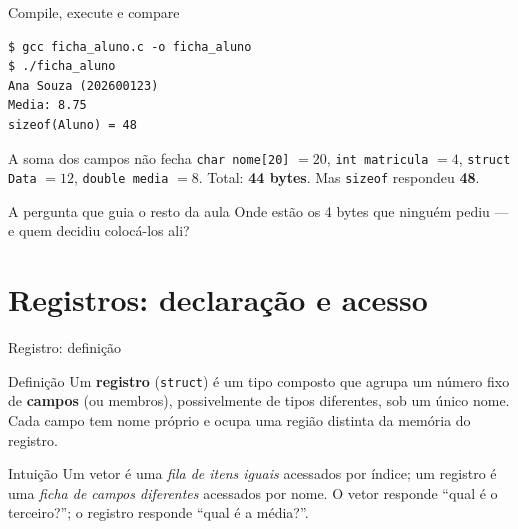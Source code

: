 \documentclass[aspectratio=169]{beamer}
\begin{document}
\begin{frame}[fragile]{Compile, execute e compare}
\begin{lstlisting}[language={}, numbers=none, basicstyle=\ttfamily\small]
$ gcc ficha_aluno.c -o ficha_aluno
$ ./ficha_aluno
Ana Souza (202600123)
Media: 8.75
sizeof(Aluno) = 48
\end{lstlisting}
  \begin{alertblock}{A soma dos campos não fecha}
    \texttt{char nome[20]} $=20$, \texttt{int matricula} $=4$,
    \texttt{struct Data} $=12$, \texttt{double media} $=8$.
    Total: \textbf{44 bytes}. Mas \texttt{sizeof} respondeu \textbf{48}.
  \end{alertblock}
  \begin{block}{A pergunta que guia o resto da aula}
    Onde estão os 4 bytes que ninguém pediu --- e quem decidiu colocá-los ali?
  \end{block}
\end{frame}

\section{Registros: declaração e acesso}

\begin{frame}{Registro: definição}
  \begin{block}{Definição}
    Um \textbf{registro} (\texttt{struct}) é um tipo composto que agrupa um
    número fixo de \textbf{campos} (ou membros), possivelmente de tipos
    diferentes, sob um único nome. Cada campo tem nome próprio e ocupa uma
    região distinta da memória do registro.
  \end{block}
  \begin{exampleblock}{Intuição}
    Um vetor é uma \emph{fila de itens iguais} acessados por índice; um
    registro é uma \emph{ficha de campos diferentes} acessados por nome.
    O vetor responde ``qual é o terceiro?''; o registro responde ``qual é a média?''.
  \end{exampleblock}
\end{frame}
\end{document}
